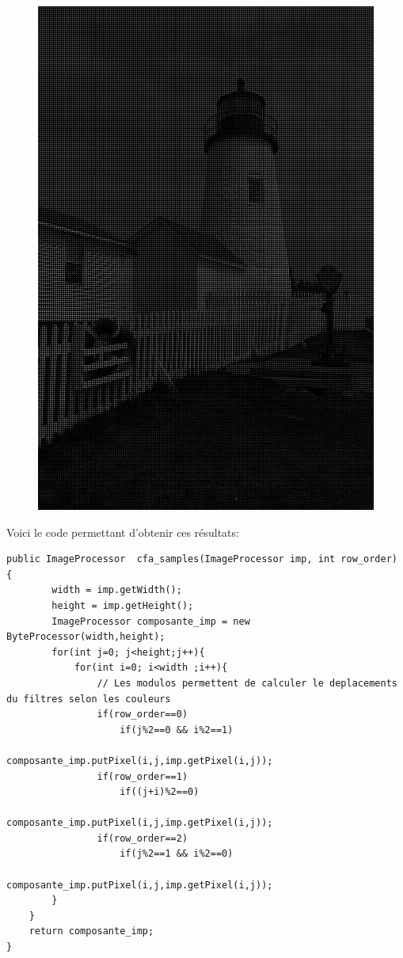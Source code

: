 \documentclass[a4paper,12pt]{report}
\begin{document}
\begin{figure}[!ht]
	\includegraphics[scale=0.3]{./image/part2-23Bleu.png}
\end{figure}

Voici le code permettant d'obtenir ces résultats: 

\begin{lstlisting}[style=Java]
public ImageProcessor  cfa_samples(ImageProcessor imp, int row_order) {
		width = imp.getWidth();
		height = imp.getHeight();
		ImageProcessor composante_imp = new ByteProcessor(width,height);
		for(int j=0; j<height;j++){
			for(int i=0; i<width ;i++){
				// Les modulos permettent de calculer le deplacements du filtres selon les couleurs
				if(row_order==0)
					if(j%2==0 && i%2==1)
						composante_imp.putPixel(i,j,imp.getPixel(i,j));
				if(row_order==1)
					if((j+i)%2==0)
						composante_imp.putPixel(i,j,imp.getPixel(i,j));
				if(row_order==2)
					if(j%2==1 && i%2==0)
						composante_imp.putPixel(i,j,imp.getPixel(i,j));	
		}			
	}		
	return composante_imp;
}
\end{lstlisting}
\end{document}
